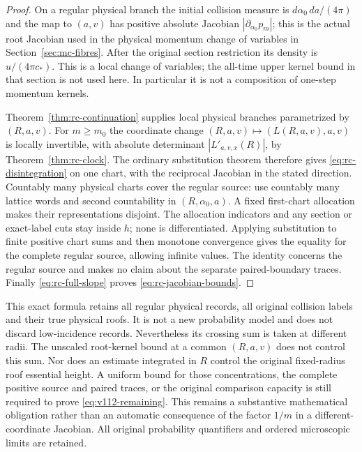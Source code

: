 \begin{proof}
On a regular physical branch the initial collision measure is
$d\alpha_0\,da/(4\pi)$ and the map to $(a,v)$ has positive absolute
Jacobian $|\partial_{\alpha_0}p_m|$; this is the actual root
Jacobian used in the physical momentum change of variables in
Section~\ref{sec:mc-fibres}.  After the original section restriction
its density is $u/(4\pi c_*)$.  This is a local change of variables;
the all-time upper kernel bound in that section is not used here.
In particular it is not a composition of one-step momentum kernels.

Theorem~\ref{thm:rc-continuation} supplies local physical branches
parametrized by $(R,a,v)$.  For $m\geq m_0$ the coordinate change
$(R,a,v)\mapsto(L(R,a,v),a,v)$ is locally invertible, with absolute
determinant $|L'_{a,v,x}(R)|$, by Theorem~\ref{thm:rc-clock}.
The ordinary substitution theorem therefore gives
\eqref{eq:rc-disintegration} on one chart, with the reciprocal
Jacobian in the stated direction.  Countably many physical charts
cover the regular source: use countably many lattice words and
second countability in $(R,\alpha_0,a)$.  A fixed first-chart
allocation makes their representations disjoint.  The allocation
indicators and any section or exact-label cuts stay inside $h$;
none is differentiated.  Applying substitution to finite positive
chart sums and then monotone convergence gives the equality for
the complete regular source, allowing infinite values.  The
identity concerns the regular source and makes no claim about the
separate paired-boundary traces.
Finally \eqref{eq:rc-full-slope} proves
\eqref{eq:rc-jacobian-bounds}.
\end{proof}

\begin{remark}
\label{rem:rc-unpaid}
This exact formula retains all regular physical records, all
original collision labels and their true physical roofs.  It is
not a new probability model and does not discard low-incidence
records.  Nevertheless its crossing sum is taken at different
radii.  The unscaled root-kernel bound at a common $(R,a,v)$ does
not control this sum.  Nor does an estimate integrated in $R$
control the original fixed-radius roof essential height.  A
uniform bound for those concentrations, the complete positive
source and paired traces, or the original comparison capacity
is still required to prove \eqref{eq:v112-remaining}.  This remains
a substantive mathematical obligation rather than an automatic
consequence of the factor $1/m$ in a different-coordinate
Jacobian.  All original probability quantifiers and ordered
microscopic limits are retained.
\end{remark}
